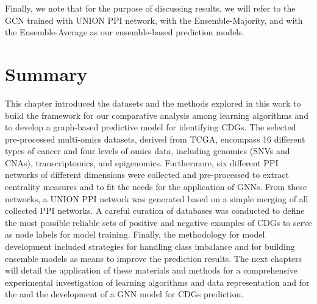 Finally, we note that for the purpose of discussing results, we will refer to the GCN trained with UNION PPI network, with the Ensemble-Majority, and with the Ensemble-Average as our ensemble-based prediction models. 








\section{Summary}
This chapter introduced the datasets and the methods explored in this work to build the framework for our comparative analysis among learning algorithms and to develop a graph-based predictive model for identifying CDGs.  The selected pre-processed multi-omics datasets, derived from TCGA, encompass 16 different types of cancer and four levels of omics data, including genomics (SNVs and CNAs), transcriptomics, and epigenomics. Furthermore, six different PPI networks of different dimensions were collected and pre-processed to extract centrality measures and to fit the needs for the application of GNNs. From these networks, a UNION PPI network was generated based on a simple merging of all collected PPI networks. A careful curation of databases was conducted to define the most possible reliable sets of positive and negative examples of CDGs to serve as node labels for model training. Finally, the methodology for model development included strategies for handling class imbalance and for building ensemble models as means to improve the prediction results. The next chapters will detail the application of these materials and methods for a comprehensive experimental investigation of learning algorithms and data representation and for the and the development of a GNN model for CDGs prediction.







